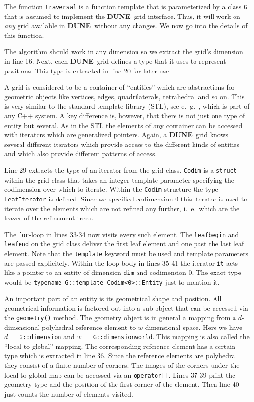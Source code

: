 \documentclass[11pt,a4paper,headinclude,footinclude,DIV14,BCOR8.25mm,titlepage,twoside,openright,normalheadings]{scrreprt}
\newcommand{\Dune}{{\sf\bfseries DUNE}}
\begin{document}
The function \lstinline!traversal! is a function template that is
parameterized by a class \lstinline!G! that is assumed to
implement the \Dune\ grid interface. 
Thus, it will work on \textit{any} grid available in \Dune\
without any changes. We now go into the details of this function.

The algorithm should work in any dimension so we extract the grid's
dimension in line 16. Next, each \Dune\
grid defines a type that it uses to represent positions. This type is
extracted in line 20 for later use. 

A grid is considered to be a container of ``entities'' which are
abstractions for geometric objects like vertices, edges,
quadrilaterals, tetrahedra, and so on. This is very similar to the
standard template library (STL), see e.~g.~\cite{Stroustrup},
which is part of any C++ system. 
A key difference is, however, that there is not just one type of entity but
several. As in the STL the elements of any container can be accessed
with iterators which are generalized pointers. Again, a \Dune\ grid
knows several different iterators which provide access to the
different kinds of entities and which also provide different patterns
of access. 

Line 29 extracts the type of an iterator from the grid
class. \lstinline!Codim! is a \lstinline!struct! within the grid class
that takes an integer template parameter specifying the codimension
over which to iterate. Within the \lstinline!Codim! structure the type
\lstinline!LeafIterator! is defined. Since we specified codimension 0
this iterator is used to iterate
over the elements which are not refined any further, i.~e.~which are
the leaves of the refinement trees.

The \lstinline!for!-loop in lines 33-34 now visits every such
element. The \lstinline!leafbegin! and \lstinline!leafend! on the grid
class deliver the first leaf element and one past the last leaf
element. Note that the \lstinline!template! keyword must be used and
template parameters are passed explicitely. Within the loop body in
lines 35-41 the iterator \lstinline!it! acts like a pointer to an entity of
dimension \lstinline!dim! and codimension 0. The exact type would be
\lstinline!typename G::template Codim<0>::Entity! just to mention
it.

An important part of an entity is its geometrical shape and
position. All geometrical information is factored out into a
sub-object that can be accessed via the \lstinline!geometry()!
method. The geometry object is in general a mapping from a $d$-dimensional
polyhedral reference element to $w$ dimensional space. Here we have
$d=$ \lstinline!G::dimension! and $w=$
\lstinline!G::dimensionworld!. This mapping is also called the ``local to
global'' mapping.
The corresponding reference element has a certain type which is
extracted in line 36. Since the reference elements are polyhedra they
consist of a finite number of corners. The images of the corners under
the local to global map can be accessed via an
\lstinline!operator[]!. Lines 37-39 print the geometry type and the
position of the first corner of the element. Then line 40 just counts
the number of elements visited.
\end{document}
